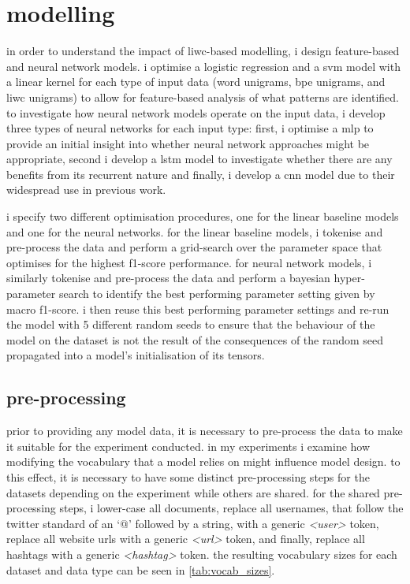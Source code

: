 \section{modelling}\label{sec:liwc_modelling}
in order to understand the impact of liwc-based modelling, i design feature-based and neural network models.
i optimise a logistic regression and a svm model with a linear kernel for each type of input data (word unigrams, bpe unigrams, and liwc unigrams) to allow for feature-based analysis of what patterns are identified.
to investigate how neural network models operate on the input data, i develop three types of neural networks for each input type: first, i optimise a mlp to provide an initial insight into whether neural network approaches might be appropriate, second i develop a lstm model to investigate whether there are any benefits from its recurrent nature and finally, i develop a cnn model due to their widespread use in previous work.

i specify two different optimisation procedures, one for the linear baseline models and one for the neural networks.
for the linear baseline models, i tokenise and pre-process the data and perform a grid-search over the parameter space that optimises for the highest f1-score performance.
for neural network models, i similarly tokenise and pre-process the data and perform a bayesian hyper-parameter search to identify the best performing parameter setting given by macro f1-score.
i then reuse this best performing parameter settings and re-run the model with 5 different random seeds to ensure that the behaviour of the model on the dataset is not the result of the consequences of the random seed propagated into a model's initialisation of its tensors.

\subsection{pre-processing}

prior to providing any model data, it is necessary to pre-process the data to make it suitable for the experiment conducted.
in my experiments i examine how modifying the vocabulary that a model relies on might influence model design.
to this effect, it is necessary to have some distinct pre-processing steps for the datasets depending on the experiment while others are shared.
for the shared pre-processing steps, i lower-case all documents, replace all usernames, that follow the twitter standard of an `@' followed by a string, with a generic \textit{<user>} token, replace all website urls with a generic \textit{<url>} token, and finally, replace all hashtags with a generic \textit{<hashtag>} token. 
the resulting vocabulary sizes for each dataset and data type can be seen in \cref{tab:vocab_sizes}.

